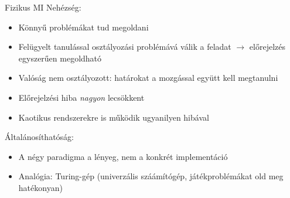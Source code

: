\begin{frame}{Fizikus MI}
    Nehézség: 
    \begin{itemize}
        \item Könnyű problémákat tud megoldani
        \item Felügyelt tanulással osztályozási problémává válik a feladat $\rightarrow$ előrejelzés egyszerűen megoldható
        \item Valóság nem osztályozott: határokat a mozgással együtt kell megtanulni
        \item Előrejelzési hiba {\it nagyon} lecsökkent
        \item Kaotikus rendszerekre is működik ugyanilyen hibával
    \end{itemize}
    
    Általánosíthatóság:
    \begin{itemize}
        \item A négy paradigma a lényeg, nem a konkrét implementáció
        \item Analógia: Turing-gép (univerzális száámítógép, játékproblémákat old meg hatékonyan)
    \end{itemize}
\end{frame}